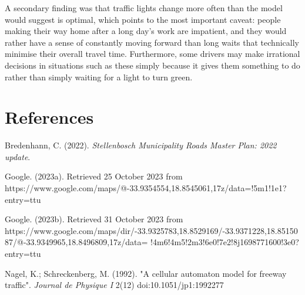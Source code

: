 \documentclass{article}
\begin{document}
A secondary finding was that traffic lights change more often than the model would suggest is optimal, which points to the most important caveat: people making their way home after a long day's work are impatient, and they would rather have a sense of constantly moving forward than long waits that technically minimise their overall travel time. Furthermore, some drivers may make irrational decisions in situations such as these simply because it gives them something to do rather than simply waiting for a light to turn green.

\pagebreak

\section*{References}

Bredenhann, C. (2022). \textit{Stellenbosch Municipality Roads Master Plan: 2022 update}.

Google. (2023a). Retrieved 25 October 2023 from https://www.google.com/maps/@-33.9354554,18.8545061,17z/data=!5m1!1e1?entry=ttu

Google. (2023b). Retrieved 31 October 2023 from https://www.google.com/maps/dir/-33.9325783,18.8529169/-33.9371228,18.8515087/@-33.9349965,18.8496809,17z/data=
!4m6!4m5!2m3!6e0!7e2!8j1698771600!3e0?entry=ttu

Nagel, K.; Schreckenberg, M. (1992). "A cellular automaton model for freeway traffic". \textit{Journal de Physique I} 2(12) doi:10.1051/jp1:1992277
\end{document}
